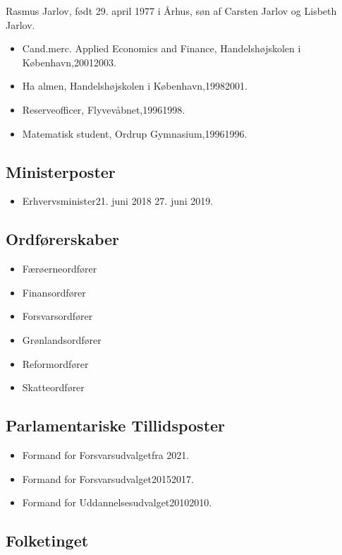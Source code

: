 \documentclass[11pt, a4paper]{awesome-cv}
\begin{document}
\makecvheader[R]
\makelettertitle
\begin{cvletter}
Rasmus Jarlov, født 29. april 1977 i Århus, søn af Carsten Jarlov og Lisbeth Jarlov.

\begin{itemize}
\item Cand.merc. Applied Economics and Finance, Handelshøjskolen i København,20012003.
\item Ha almen, Handelshøjskolen i København,19982001.
\item Reserveofficer, Flyvevåbnet,19961998.
\item Matematisk student, Ordrup Gymnasium,19961996.
\end{itemize}
\subsection*{Ministerposter}
\begin{itemize}
\item Erhvervsminister21. juni 2018  27. juni 2019.
\end{itemize}
\subsection*{Ordførerskaber}
\begin{itemize}
\item Færøerneordfører
\item Finansordfører
\item Forsvarsordfører
\item Grønlandsordfører
\item Reformordfører
\item Skatteordfører
\end{itemize}
\subsection*{Parlamentariske Tillidsposter}
\begin{itemize}
\item Formand for Forsvarsudvalgetfra 2021.
\item Formand for Forsvarsudvalget20152017.
\item Formand for Uddannelsesudvalget20102010.
\end{itemize}
\subsection*{Folketinget}

\end{cvletter}
\end{document}
